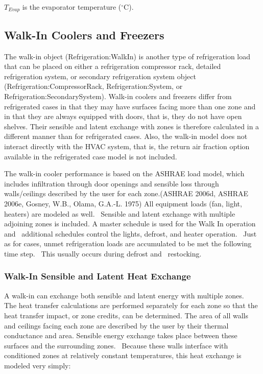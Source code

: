 \(T_{Evap}\) is the evaporator temperature (\(^{\circ}\)C).

\subsection{Walk-In Coolers and Freezers}\label{walk-in-coolers-and-freezers}

The walk-in object (Refrigeration:WalkIn) is another type of refrigeration load that can be placed on either a refrigeration compressor rack, detailed refrigeration system, or secondary refrigeration system object (Refrigeration:CompressorRack, Refrigeration:System, or Refrigeration:SecondarySystem). Walk-in coolers and freezers differ from refrigerated cases in that they may have surfaces facing more than one zone and in that they are always equipped with doors, that is, they do not have open shelves. Their sensible and latent exchange with zones is therefore calculated in a different manner than for refrigerated cases. Also, the walk-in model does not interact directly with the HVAC system, that is, the return air fraction option available in the refrigerated case model is not included.

The walk-in cooler performance is based on the ASHRAE load model, which includes infiltration through door openings and sensible loss through walls/ceilings described by the user for each zone.(ASHRAE 2006d, ASHRAE 2006e, Gosney, W.B., Olama, G.A.-L. 1975) All equipment loads (fan, light, heaters) are modeled as well.~ Sensible and latent exchange with multiple adjoining zones is included. A master schedule is used for the Walk In operation and~ additional schedules control the lights, defrost, and heater operation. ~Just as for cases, unmet refrigeration loads are accumulated to be met the following time step.~ This usually occurs during defrost and ~restocking.

\subsubsection{Walk-In Sensible and Latent Heat Exchange}\label{walk-in-sensible-and-latent-heat-exchange}

A walk-in can exchange both sensible and latent energy with multiple zones.~ The heat transfer calculations are performed separately for each zone so that the heat transfer impact, or zone credits, can be determined. The area of all walls and ceilings facing each zone are described by the user by their thermal conductance and area. Sensible energy exchange takes place between these surfaces and the surrounding zones.~ Because these walls interface with conditioned zones at relatively constant temperatures, this heat exchange is modeled very simply:

